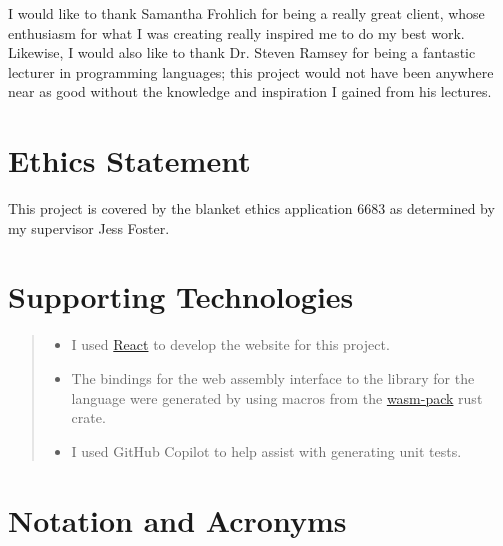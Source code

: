 I would like to thank Samantha Frohlich for being a really great client, whose enthusiasm for what I was creating really inspired me to do my best work. Likewise, I would also like to thank Dr. Steven Ramsey for being a fantastic lecturer in programming languages; this project would not have been anywhere near as good without the knowledge and inspiration I gained from his lectures. 

\makedecl
\makeaidecl
\tableofcontents
\listoffigures


\chapter*{Ethics Statement}
This project is covered by the blanket ethics application 6683 as determined by my supervisor Jess Foster. 


\chapter*{Supporting Technologies}
\label{chap:supporting_tech}

\begin{quote}
\noindent
\begin{itemize}
\item I used \href{https://react.dev/}{React} to develop the website for this project.
\item The bindings for the web assembly interface to the library for the language were generated by using macros from the \href{https://github.com/rustwasm/wasm-pack}{wasm-pack} rust crate.
\item I used GitHub Copilot to help assist with generating unit tests.
\end{itemize}
\end{quote}


\chapter*{Notation and Acronyms}
\begin{acronym}
\end{acronym}